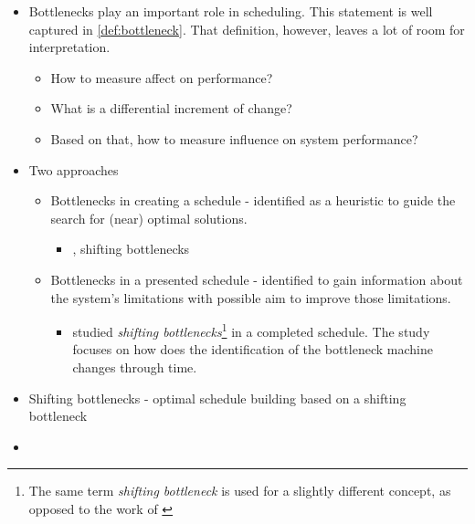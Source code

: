 \begin{itemize}
    \item Bottlenecks play an important role in scheduling. This statement is well captured
        in \cref{def:bottleneck}. That definition, however, leaves a lot of room for interpretation.
        \begin{itemize}
            \item How to measure affect on performance?
            \item What is a differential increment of change?
            \item Based on that, how to measure influence on system performance?
        \end{itemize}

    \item Two approaches
    \begin{itemize}
        \item Bottlenecks in creating a schedule - identified as a heuristic to guide the search
            for (near) optimal solutions.
        \begin{itemize}
            \item \citet{ADAMS1988}, shifting bottlenecks
        \end{itemize}

        \item Bottlenecks in a presented schedule - identified to gain information about the system's
            limitations with possible aim to improve those limitations.
        \begin{itemize}
            \item \citet{LAWRENCE1994} studied \emph{shifting bottlenecks}\footnote{The same term
                \emph{shifting bottleneck} is used for a slightly different concept, as opposed to the work
                of \citet{ADAMS1988}} in a completed schedule. The study focuses on how does
                the identification of the bottleneck machine changes through time.

        \end{itemize}
        
    \end{itemize}

    \item Shifting bottlenecks - optimal schedule building based on a shifting bottleneck
    \item 
\end{itemize}

